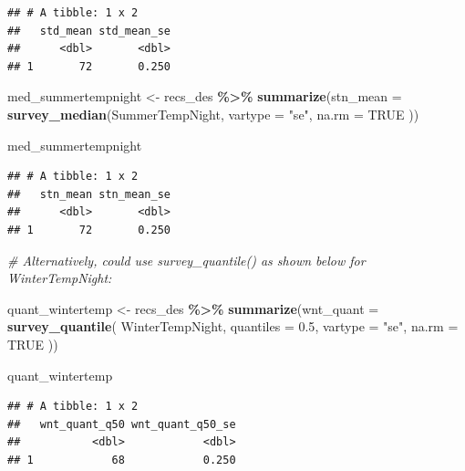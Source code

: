 \documentclass[
]{krantz}
\makeatletter
\newenvironment{Shaded}{\begin{snugshade}}{\end{snugshade}}
\newcommand{\AttributeTok}[1]{\textcolor[rgb]{0.27,0.27,0.27}{#1}}
\newcommand{\CommentTok}[1]{\textcolor[rgb]{0.37,0.37,0.37}{\textit{#1}}}
\newcommand{\ConstantTok}[1]{\textcolor[rgb]{0.37,0.37,0.37}{#1}}
\newcommand{\FloatTok}[1]{\textcolor[rgb]{0.06,0.06,0.06}{#1}}
\newcommand{\FunctionTok}[1]{\textcolor[rgb]{0.27,0.27,0.27}{\textbf{#1}}}
\newcommand{\NormalTok}[1]{#1}
\newcommand{\OtherTok}[1]{\textcolor[rgb]{0.37,0.37,0.37}{#1}}
\newcommand{\SpecialCharTok}[1]{\textcolor[rgb]{0.43,0.43,0.43}{\textbf{#1}}}
\newcommand{\StringTok}[1]{\textcolor[rgb]{0.5,0.5,0.5}{#1}}
\newenvironment{kframe}{%
\medskip{}
\setlength{\fboxsep}{.8em}
 \def\at@end@of@kframe{}%
 \ifinner\ifhmode%
  \def\at@end@of@kframe{\end{minipage}}%
  \begin{minipage}{\columnwidth}%
 \fi\fi%
 \def\FrameCommand##1{\hskip\@totalleftmargin \hskip-\fboxsep
 \colorbox{shadecolor}{##1}\hskip-\fboxsep
     \hskip-\linewidth \hskip-\@totalleftmargin \hskip\columnwidth}%
 \MakeFramed {\advance\hsize-\width
   \@totalleftmargin\z@ \linewidth\hsize
   \@setminipage}}%
 {\par\unskip\endMakeFramed%
 \at@end@of@kframe}
\renewenvironment{Shaded}{\begin{kframe}}{\end{kframe}}
\makeatother
\begin{document}
\begin{verbatim}
## # A tibble: 1 x 2
##   std_mean std_mean_se
##      <dbl>       <dbl>
## 1       72       0.250
\end{verbatim}

\begin{Shaded}
\begin{Highlighting}[]
\NormalTok{med\_summertempnight }\OtherTok{\textless{}{-}}\NormalTok{ recs\_des }\SpecialCharTok{\%\textgreater{}\%}
  \FunctionTok{summarize}\NormalTok{(}\AttributeTok{stn\_mean =} \FunctionTok{survey\_median}\NormalTok{(SummerTempNight,}
    \AttributeTok{vartype =} \StringTok{"se"}\NormalTok{,}
    \AttributeTok{na.rm =} \ConstantTok{TRUE}
\NormalTok{  ))}

\NormalTok{med\_summertempnight}
\end{Highlighting}
\end{Shaded}

\begin{verbatim}
## # A tibble: 1 x 2
##   stn_mean stn_mean_se
##      <dbl>       <dbl>
## 1       72       0.250
\end{verbatim}

\begin{Shaded}
\begin{Highlighting}[]
\CommentTok{\# Alternatively, could use \textasciigrave{}survey\_quantile()\textasciigrave{} as shown below for WinterTempNight:}

\NormalTok{quant\_wintertemp }\OtherTok{\textless{}{-}}\NormalTok{ recs\_des }\SpecialCharTok{\%\textgreater{}\%}
  \FunctionTok{summarize}\NormalTok{(}\AttributeTok{wnt\_quant =} \FunctionTok{survey\_quantile}\NormalTok{(}
\NormalTok{    WinterTempNight,}
    \AttributeTok{quantiles =} \FloatTok{0.5}\NormalTok{,}
    \AttributeTok{vartype =} \StringTok{"se"}\NormalTok{,}
    \AttributeTok{na.rm =} \ConstantTok{TRUE}
\NormalTok{  ))}

\NormalTok{quant\_wintertemp}
\end{Highlighting}
\end{Shaded}

\begin{verbatim}
## # A tibble: 1 x 2
##   wnt_quant_q50 wnt_quant_q50_se
##           <dbl>            <dbl>
## 1            68            0.250
\end{verbatim}
\end{document}
